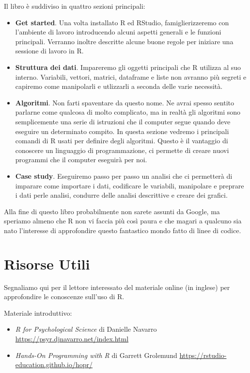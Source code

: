 \documentclass[
]{book}
\providecommand{\tightlist}{%
  \setlength{\itemsep}{0pt}\setlength{\parskip}{0pt}}
\begin{document}
Il libro è suddiviso in quattro sezioni principali:

\begin{itemize}
\tightlist
\item
  \textbf{Get started}. Una volta installato R ed RStudio, famiglierizzeremo con l'ambiente di lavoro introducendo alcuni aspetti generali e le funzioni principali. Verranno inoltre descritte alcune buone regole per iniziare una sessione di lavoro in R.
\item
  \textbf{Struttura dei dati}. Impareremo gli oggetti principali che R utilizza al suo interno. Variabili, vettori, matrici, dataframe e liste non avranno più segreti e capiremo come manipolarli e utlizzarli a seconda delle varie necessità.
\item
  \textbf{Algoritmi}. Non farti spaventare da questo nome. Ne avrai spesso sentito parlarne come qualcosa di molto complicato, ma in realtà gli algoritmi sono semplicemente una serie di istruzioni che il computer segue quando deve eseguire un determinato compito. In questa sezione vedremo i principali comandi di R usati per definire degli algoritmi. Questo è il vantaggio di conoscere un linguaggio di programmazione, ci permette di creare nuovi programmi che il computer eseguirà per noi.
\item
  \textbf{Case study}. Eseguiremo passo per passo un analisi che ci permetterà di imparare come importare i dati, codificare le variabili, manipolare e preprare i dati perle analisi, condurre delle analisi descrittive e creare dei grafici.
\end{itemize}

Alla fine di questo libro probabilmente non sarete assunti da Google, ma speriamo almeno che R non vi faccia più così paura e che magari a qualcuno sia nato l'interesse di approfondire questo fantastico mondo fatto di linee di codice.

\hypertarget{risorse-utili}{%
\section*{Risorse Utili}\label{risorse-utili}}

Segnaliamo qui per il lettore interessato del materiale online (in inglese) per approfondire le conoscenze sull'uso di R.

Materiale introduttivo:

\begin{itemize}
\tightlist
\item
  \emph{R for Psychological Science} di Danielle Navarro \url{https://psyr.djnavarro.net/index.html}
\item
  \emph{Hands-On Programming with R} di Garrett Grolemund \url{https://rstudio-education.github.io/hopr/}
\end{itemize}
\end{document}
